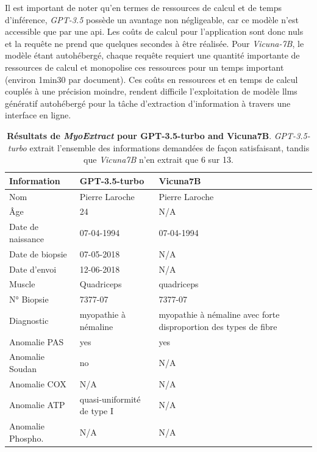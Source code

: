 Il est important de noter qu'en termes de ressources de calcul et de temps d'inférence, \textit{GPT-3.5} possède un avantage non négligeable, car ce modèle n'est accessible que par une \gls{api}. Les coûts de calcul pour l'application sont donc nuls et la requête ne prend que quelques secondes à être réalisée. Pour \textit{Vicuna-7B}, le modèle étant autohébergé, chaque requête requiert une quantité importante de ressources de calcul et monopolise ces ressources pour un temps important (environ 1min30 par document). Ces coûts en ressources et en temps de calcul couplés à une précision moindre, rendent difficile l'exploitation de modèle \gls{llms} génératif autohébergé pour la tâche d'extraction d'information à travers une interface en ligne.
\begin{table}[!ht]
\centering
\caption[Résultats de \textit{MyoExtract} pour \textit{GPT-3.5-turbo} and \textit{Vicuna7B}]{\textbf{Résultats de \textit{MyoExtract} pour GPT-3.5-turbo and Vicuna7B}. \textit{GPT-3.5-turbo} extrait l'ensemble des informations demandées de façon satisfaisant, tandis que \textit{Vicuna7B} n'en extrait que 6 sur 13.}
\label{tab:json_data}
\begin{tabularx}{\textwidth}{|l|X|X|}
\hline
\textbf{Information} & \textbf{GPT-3.5-turbo} & \textbf{Vicuna7B} \\ \hline
Nom & Pierre Laroche & Pierre Laroche \\ \hline
Âge & 24 & N/A \\ \hline
Date de naissance & 07-04-1994 & 07-04-1994 \\ \hline
Date de biopsie & 07-05-2018 & N/A \\ \hline
Date d'envoi & 12-06-2018 & N/A \\ \hline
Muscle & Quadriceps & quadriceps \\ \hline
N° Biopsie & 7377-07 & 7377-07 \\ \hline
Diagnostic & myopathie à némaline & myopathie à némaline avec forte disproportion des types de fibre \\ \hline
Anomalie PAS & yes & yes \\ \hline
Anomalie Soudan & no & N/A \\ \hline
Anomalie COX & N/A & N/A \\ \hline
Anomalie ATP & quasi-uniformité de type I & N/A \\ \hline
Anomalie Phospho. & N/A & N/A \\ \hline
\end{tabularx}
\end{table}

